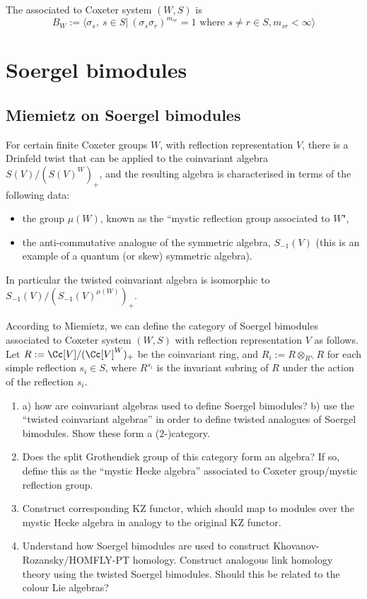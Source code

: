 \begin{definition} The  associated to Coxeter system $(W,S)$ is $$B_W:=\langle \sigma_s,\ s\in S|\ (\sigma_s \sigma_r)^{m_{sr}}=1\text{ where }s\neq r\in S, m_{sr}<\infty\rangle$$
\end{definition}


\iffalse
\section{Soergel bimodules}

\subsection{Miemietz on Soergel bimodules}\label{miemietz_sec}
For certain finite Coxeter groups $W$, with reflection representation $V$, there is a Drinfeld twist that can be applied to the coinvariant algebra $S(V)/(S(V)^W)_+$, and the resulting algebra is characterised in terms of the following data:
\begin{itemize}
  \item the group $\mu(W)$, known as the ``mystic reflection group associated to $W$",
  \item the anti-commutative analogue of the symmetric algebra, $S_{-1}(V)$ (this is an example of a quantum (or skew) symmetric algebra).
\end{itemize}
In particular the twisted coinvariant algebra is isomorphic to $S_{-1}(V)/(S_{-1}(V)^{\mu(W)})_+$.\bb

\nt According to Miemietz, we can define the category of Soergel bimodules associated to Coxeter system $(W,S)$ with reflection representation $V$ as follows. Let $R:=\Cc[V]/(\Cc[V]^W)_+$ be the coinvariant ring, and $R_i:=R\otimes_{R^{s_i}}R$ for each simple reflection $s_i\in S$, where $R^{s_i}$ is the invariant subring of $R$ under the action of the reflection $s_i$.

\begin{enumerate}
  \item a) how are coinvariant algebras used to define Soergel bimodules? b) use the ``twisted coinvariant algebras'' in order to define twisted analogues of Soergel bimodules. Show these form a (2-)category.
  \item Does the split Grothendiek group of this category form an algebra? If so, define this as the ``mystic Hecke algebra'' associated to Coxeter group/mystic reflection group. 
  \item Construct corresponding KZ functor, which should map to modules over the mystic Hecke algebra in analogy to the original KZ functor.
  \item Understand how Soergel bimodules are used to construct Khovanov-Rozansky/HOMFLY-PT homology. Construct analogous link homology theory using the twisted Soergel bimodules. Should this be related to the colour Lie algebras?
\end{enumerate}

